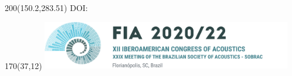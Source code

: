 \pagestyle{plain}
\thispagestyle{firststyle}
\begin{textblock}{200}(150.2,283.51)
\fontsize{8}{8}\selectfont\sffamily 
DOI:~\href{https://doi.org/\DOIArtigo}{\DOIArtigo}
\end{textblock}
\begin{textblock}{170}(37,12)
\includegraphics[width=0.82\textwidth,page=1]{FIA-logo.pdf}
\end{textblock}

